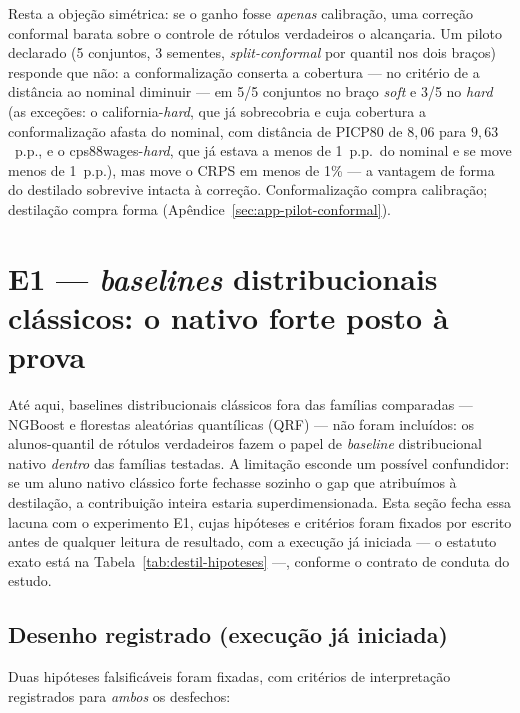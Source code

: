 Resta a objeção simétrica: se o ganho fosse \emph{apenas} calibração,
uma correção conformal barata sobre o controle de rótulos verdadeiros
o alcançaria. Um piloto declarado (5 conjuntos, 3 sementes,
\emph{split-conformal} por quantil nos dois braços) responde que não:
a conformalização conserta a cobertura --- no critério de a distância
ao nominal diminuir --- em 5/5 conjuntos no braço \emph{soft} e 3/5 no
\emph{hard} (as exceções: o california-\emph{hard}, que já sobrecobria
e cuja cobertura a conformalização afasta do nominal, com distância de
PICP80 de $8{,}06$ para $9{,}63$~p.p., e o cps88wages-\emph{hard},
que já estava a menos de 1~p.p.\ do nominal e se move menos de
1~p.p.), mas
move o CRPS em menos de 1\% --- a vantagem de forma do destilado
sobrevive intacta à correção. Conformalização compra calibração;
destilação compra forma (Apêndice~\ref{sec:app-pilot-conformal}).

\section{E1 --- \emph{baselines} distribucionais clássicos: o nativo forte
posto à prova}
\label{sec:destil-e1}

Até aqui, baselines
distribucionais clássicos fora das famílias comparadas --- NGBoost
\citep{duan2020} e florestas aleatórias quantílicas (QRF)
\citep{meinshausen2006} --- não
foram incluídos: os alunos-quantil de rótulos verdadeiros fazem o
papel de \emph{baseline} distribucional nativo \emph{dentro} das famílias
testadas. A limitação esconde um possível confundidor: se um aluno
nativo clássico forte fechasse sozinho o gap que atribuímos à
destilação, a contribuição inteira estaria superdimensionada. Esta
seção fecha essa lacuna com o experimento E1, cujas hipóteses e
critérios foram fixados por escrito antes de qualquer leitura de
resultado, com a execução já iniciada --- o estatuto exato está na
Tabela~\ref{tab:destil-hipoteses} ---, conforme o contrato de conduta
do estudo.

\subsection{Desenho registrado (execução já iniciada)}
\label{sec:destil-e1-desenho}

Duas hipóteses falsificáveis foram fixadas, com critérios de
interpretação registrados para \emph{ambos} os desfechos:

